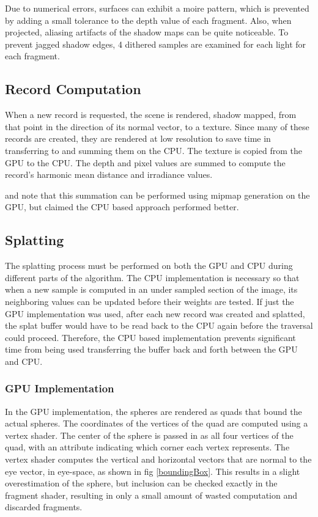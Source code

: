 \documentclass[10pt,twopage]{acmsiggraph}
\begin{document}
Due to numerical errors, surfaces can exhibit a moire pattern, which is prevented by adding a small tolerance to the depth value of each fragment.  Also, when projected, aliasing artifacts of the shadow maps can be quite noticeable.  To prevent jagged shadow edges, 4 dithered samples are examined for each light for each fragment.

\subsection{Record Computation}
When a new record is requested, the scene is rendered, shadow mapped, from that point in the direction of its normal vector, to a texture.  Since many of these records are created, they are rendered at low resolution to save time in transferring to and summing them on the CPU.    The texture is copied from the GPU to the CPU.  The depth and pixel values are summed to compute the record's harmonic mean distance and irradiance values.  

\cite{mainpaper} and \cite{larsen2004simulating} note that this summation can be performed using mipmap generation on the GPU, but \cite{mainpaper} claimed the CPU based approach performed better.

\subsection{Splatting}
The splatting process must be performed on both the GPU and CPU during different parts of the algorithm.  The CPU implementation is necessary so that when a new sample is computed in an under sampled section of the image, its neighboring values can be updated before their weights are tested.  If just the GPU implementation was used, after each new record was created and splatted, the splat buffer would have to be read back to the CPU again before the traversal could proceed.  Therefore, the CPU based implementation prevents significant time from being used transferring the buffer back and forth between the GPU and CPU.

\subsubsection{GPU Implementation}
In the GPU implementation, the spheres are rendered as quads that bound the actual spheres.  The coordinates of the vertices of the quad are computed using a vertex shader.  The center of the sphere is passed in as all four vertices of the quad, with an attribute indicating which corner each vertex represents.  The vertex shader computes the vertical and horizontal vectors that are normal to the eye vector, in eye-space, as shown in fig \ref{boundingBox}.  This results in a slight overestimation of the sphere, but inclusion can be checked exactly in the fragment shader, resulting in only a small amount of wasted computation and discarded fragments.  
\end{document}
